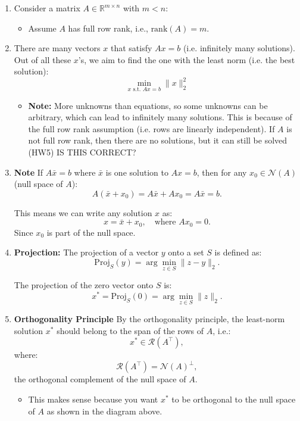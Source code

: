 \begin{derivation}
    \begin{enumerate}
        \item Consider a matrix \( A \in \mathbb{R}^{m \times n} \) with \( m < n \):
        
        \begin{itemize}
            \item Assume \( A \) has full row rank, i.e., \(\text{rank}(A) = m\). 
        \end{itemize}
        \item There are many vectors \( x \) that satisfy \( A x = b \) (i.e. infinitely many solutions). Out of all these \( x \)'s, we aim to find the one with the least norm (i.e. the best solution):
        \[
        \min_{x \text{ s.t. } A x = b} \|x\|_2^2
        \]
        \begin{itemize}
            \item \textbf{Note:} More unknowns than equations, so some unknowns can be arbitrary, which can lead to infinitely many solutions. This is because of the full row rank assumption (i.e. rows are linearly independent). If \( A \) is not full row rank, then there are no solutions, but it can still be solved (HW5) IS THIS CORRECT?
        \end{itemize}
        
        \item \textbf{Note} If \( A \bar{x} = b \) where $\bar{x}$ is one solution to $Ax=b$, then for any \( x_0 \in \mathcal{N}(A) \) (null space of \( A \)):
        \[
        A (\bar{x} + x_0) = A \bar{x} + A x_0 = A \bar{x} = b.
        \]
        
        This means we can write any solution \( x \) as:
        \[
        x = \bar{x} + x_0, \quad \text{where } A x_0 = 0.
        \]
        Since $x_0$ is part of the null space. 
        
        \item \textbf{Projection:} The projection of a vector \(y\) onto a set \(S\) is defined as:
        \[
        \text{Proj}_S(y) = \arg \min_{z \in S} \|z - y\|_2.
        \]

        The projection of the zero vector onto \(S\) is:
        \[
        x^* = \text{Proj}_S(0) = \arg \min_{z \in S} \|z\|_2.
        \]

        \item \textbf{Orthogonality Principle} By the orthogonality principle, the least-norm solution \(x^*\) should belong to the span of the rows of \(A\), i.e.:
        \[
        x^* \in \mathcal{R}(A^\top),
        \]
        where:
        \[
        \mathcal{R}(A^\top) = \mathcal{N}(A)^\perp,
        \]
        the orthogonal complement of the null space of \(A\).
        \begin{itemize}
            \item This makes sense because you want $x^*$ to be orthogonal to the null space of $A$ as shown in the diagram above. 
        \end{itemize}


\end{enumerate}
\end{derivation}
